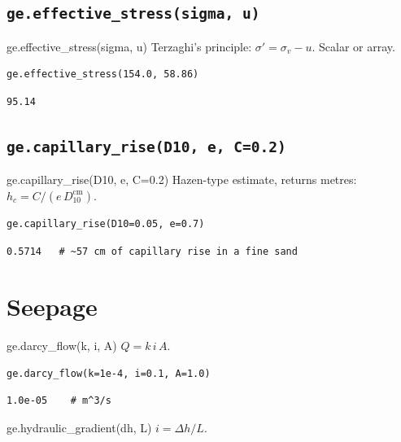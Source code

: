 \documentclass[11pt,a4paper,openany]{book}
\newcommand{\sigmaeff}{\sigma'}
\newcommand{\sigmav}{\sigma_v}
\begin{document}
\subsection{\texttt{ge.effective\_stress(sigma, u)}}

\begin{funcbox}{ge.effective\_stress(sigma, u)}
Terzaghi's principle: $\sigmaeff = \sigmav - u$. Scalar or array.
\end{funcbox}

\begin{lstlisting}
ge.effective_stress(154.0, 58.86)
\end{lstlisting}
\begin{lstlisting}[style=output]
95.14
\end{lstlisting}

\subsection{\texttt{ge.capillary\_rise(D10, e, C=0.2)}}

\begin{funcbox}{ge.capillary\_rise(D10, e, C=0.2)}
Hazen-type estimate, returns metres:
$h_c = C / (e\, D_{10}^{\text{cm}})$.
\end{funcbox}

\begin{lstlisting}
ge.capillary_rise(D10=0.05, e=0.7)
\end{lstlisting}
\begin{lstlisting}[style=output]
0.5714   # ~57 cm of capillary rise in a fine sand
\end{lstlisting}

\section{Seepage}

\begin{funcbox}{ge.darcy\_flow(k, i, A)}
$Q = k\,i\,A$.
\end{funcbox}

\begin{lstlisting}
ge.darcy_flow(k=1e-4, i=0.1, A=1.0)
\end{lstlisting}
\begin{lstlisting}[style=output]
1.0e-05    # m^3/s
\end{lstlisting}

\begin{funcbox}{ge.hydraulic\_gradient(dh, L)}
$i = \Delta h / L$.
\end{funcbox}
\end{document}
